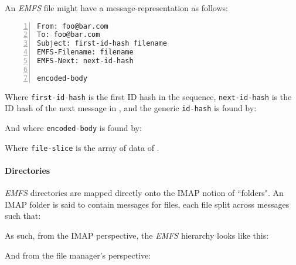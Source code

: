 \documentclass[12pt]{article}
\begin{document}
An \textit{EMFS} file might have a message-representation as follows:

\begin{lstlisting}[caption=EMFS Message,numbers=left,showspaces=true,label={messagerep}]
From: foo@bar.com
To: foo@bar.com
Subject: first-id-hash filename
EMFS-Filename: filename
EMFS-Next: next-id-hash

encoded-body
\end{lstlisting}

Where \texttt{first-id-hash} is the first ID hash in the sequence,
\texttt{next-id-hash} is the ID hash of the next message in , and the
generic \texttt{id-hash} is found by:



And where \texttt{encoded-body} is found by:



Where \texttt{file-slice} is the array of data of .

\paragraph{Directories}

\textit{EMFS} directories are mapped directly onto the IMAP notion of
``folders". An IMAP folder is said to contain  messages for  files, each
file split across  messages such that:



As such, from the IMAP perspective, the \textit{EMFS} hierarchy looks like this:


And from the file manager's perspective:

\end{document}
